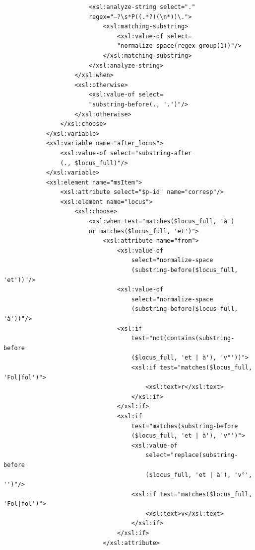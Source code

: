 \documentclass[a4paper,12pt,twoside]{book}
\begin{document}
\begin{verbatim}
                        <xsl:analyze-string select="." 
                        regex="—?\s*P((.*?)(\n*))\.">
                            <xsl:matching-substring>
                                <xsl:value-of select=
                                "normalize-space(regex-group(1))"/>
                            </xsl:matching-substring>
                        </xsl:analyze-string>
                    </xsl:when>
                    <xsl:otherwise>
                        <xsl:value-of select=
                        "substring-before(., '.')"/>
                    </xsl:otherwise>
                </xsl:choose>
            </xsl:variable>
            <xsl:variable name="after_locus">
                <xsl:value-of select="substring-after
                (., $locus_full)"/>
            </xsl:variable>
            <xsl:element name="msItem">
                <xsl:attribute select="$p-id" name="corresp"/>
                <xsl:element name="locus">
                    <xsl:choose>
                        <xsl:when test="matches($locus_full, 'à') 
                        or matches($locus_full, 'et')">
                            <xsl:attribute name="from">
                                <xsl:value-of
                                    select="normalize-space
                                    (substring-before($locus_full, 'et'))"/>
                                <xsl:value-of
                                    select="normalize-space
                                    (substring-before($locus_full, 'à'))"/>
                                <xsl:if
                                    test="not(contains(substring-before
                                    ($locus_full, 'et | à'), 'v°'))">
                                    <xsl:if test="matches($locus_full, 'Fol|fol')">
                                        <xsl:text>r</xsl:text>
                                    </xsl:if>
                                </xsl:if>
                                <xsl:if
                                    test="matches(substring-before
                                    ($locus_full, 'et | à'), 'v°')">
                                    <xsl:value-of
                                        select="replace(substring-before
                                        ($locus_full, 'et | à'), 'v°', '')"/>
                                    <xsl:if test="matches($locus_full, 'Fol|fol')">
                                        <xsl:text>v</xsl:text>
                                    </xsl:if>
                                </xsl:if>
                            </xsl:attribute>

\end{verbatim}
\end{document}
